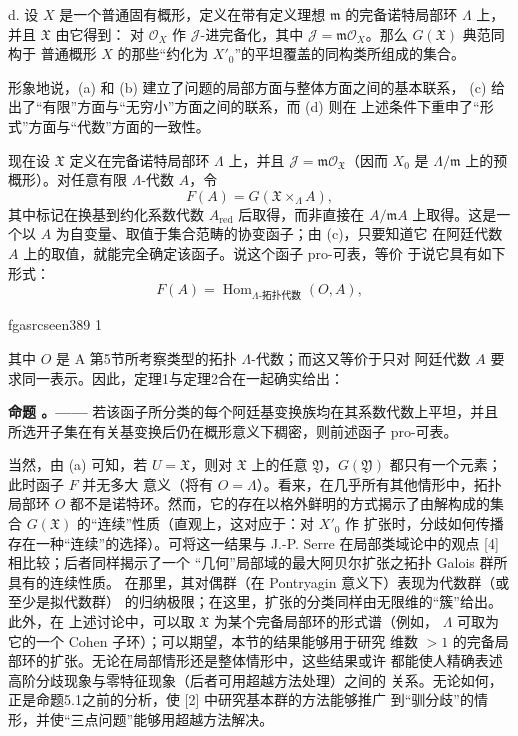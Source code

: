 \documentclass[12pt,twoside,openany]{book}
\numberwithin{equation}{section}
\newcommand{\fgaunitid}{unbound}
\newcommand{\src}[1]{%
  \phantomsection
  \hypertarget{src:\fgaunitid:#1}{}%
  \hypertarget{fga.\fgaunitid.p#1}{}%
  \ifcsname fgasrcseen#1\endcsname\else
    \expandafter\gdef\csname fgasrcseen#1\endcsname{1}%
    \hypertarget{src:#1}{}%
  \fi
  \marginpar{\raggedleft\footnotesize\sffamily #1}%
}
\newcommand{\fquote}[1]{“#1”}
\theoremstyle{plain}
\theoremstyle{definition}
\theoremstyle{remark}
\newcommand{\result}[2]{%
  \par\medskip\noindent\textbf{#1%
  \if\relax\detokenize{#2}\relax\else\space#2\fi。——}\enspace
}
\begin{document}
\noindent d. 设 $X$ 是一个普通固有概形，定义在带有定义理想 $\mathfrak m$
的完备诺特局部环 $\Lambda$ 上，并且 $\mathfrak X$ 由它得到：
对 $\mathcal O_X$ 作 $\mathcal J$-进完备化，其中
$\mathcal J=\mathfrak m\mathcal O_X$。那么 $G(\mathfrak X)$ 典范同构于
普通概形 $X$ 的那些\fquote{约化为 $X'_0$}的平坦覆盖的同构类所组成的集合。

形象地说，(a) 和 (b) 建立了问题的局部方面与整体方面之间的基本联系，
(c) 给出了\fquote{有限}方面与\fquote{无穷小}方面之间的联系，而 (d) 则在
上述条件下重申了\fquote{形式}方面与\fquote{代数}方面的一致性。

现在设 $\mathfrak X$ 定义在完备诺特局部环 $\Lambda$ 上，并且
$\mathcal J=\mathfrak m\mathcal O_{\mathfrak X}$（因而 $X_0$ 是
$\Lambda/\mathfrak m$ 上的预概形）。对任意有限 $\Lambda$-代数 $A$，令
\[
  F(A)=G(\mathfrak X\times_\Lambda A),
\]
其中标记在换基到约化系数代数 $A_{\mathrm{red}}$ 后取得，而非直接在 $A/\mathfrak mA$ 上取得。这是一个以 $A$ 为自变量、取值于集合范畴的协变函子；由 (c)，只要知道它
在阿廷代数 $A$ 上的取值，就能完全确定该函子。说这个函子 pro-可表，等价
于说它具有如下形式：
\[
  F(A)=\operatorname{Hom}_{\Lambda\text{-拓扑代数}}(O,A),
\]

\src{389}
其中 $O$ 是 A 第5节所考察类型的拓扑 $\Lambda$-代数；而这又等价于只对
阿廷代数 $A$ 要求同一表示。因此，定理1与定理2合在一起确实给出：

\result{命题}{5.1} 若该函子所分类的每个阿廷基变换族均在其系数代数上平坦，并且所选开子集在有关基变换后仍在概形意义下稠密，则前述函子 pro-可表。

当然，由 (a) 可知，若 $U=\mathfrak X$，则对 $\mathfrak X$ 上的任意
$\mathfrak Y$，$G(\mathfrak Y)$ 都只有一个元素；此时函子 $F$ 并无多大
意义（将有 $O=\Lambda$）。看来，在几乎所有其他情形中，拓扑局部环 $O$
都不是诺特环。然而，它的存在以格外鲜明的方式揭示了由解构成的集合
$G(\mathfrak X)$ 的\fquote{连续}性质（直观上，这对应于：对 $X'_0$ 作
扩张时，分歧如何传播存在一种\fquote{连续}的选择）。可将这一结果与
J.-P. Serre 在局部类域论中的观点 [4] 相比较；后者同样揭示了一个
\fquote{几何}局部域的最大阿贝尔扩张之拓扑 Galois 群所具有的连续性质。
在那里，其对偶群（在 Pontryagin 意义下）表现为代数群（或至少是拟代数群）
的归纳极限；在这里，扩张的分类同样由无限维的\fquote{簇}给出。此外，在
上述讨论中，可以取 $\mathfrak X$ 为某个完备局部环的形式谱（例如，
$\Lambda$ 可取为它的一个 Cohen 子环）；可以期望，本节的结果能够用于研究
维数 $>1$ 的完备局部环的扩张。无论在局部情形还是整体情形中，这些结果或许
都能使人精确表述高阶分歧现象与零特征现象（后者可用超越方法处理）之间的
关系。无论如何，正是命题5.1之前的分析，使 [2] 中研究基本群的方法能够推广
到\fquote{驯分歧}的情形，并使\fquote{三点问题}能够用超越方法解决。
\end{document}
